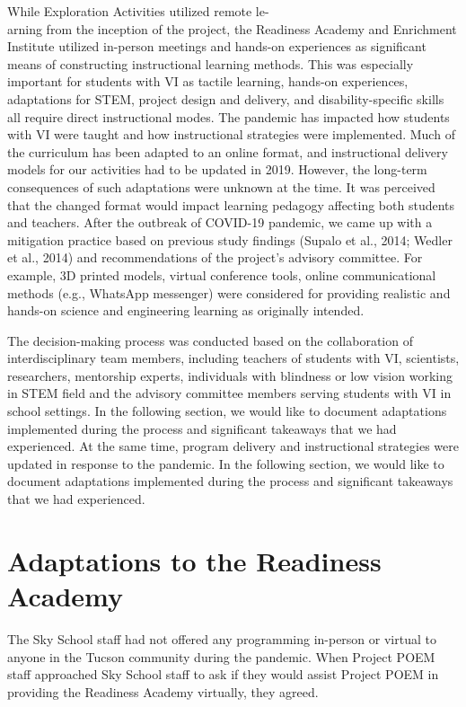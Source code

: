 \documentclass[11pt]{sig-alternate}
\begin{document}
\begin{large}
{While Exploration Activities utilized remote le-\\arning from the inception of the project, the Readiness Academy and Enrichment Institute utilized in-person meetings and hands-on experiences as significant means of constructing instructional learning methods. This was especially important for students with VI as tactile learning, hands-on experiences, adaptations for STEM, project design and delivery, and disability-specific skills all require direct instructional modes. The pandemic has impacted how students with VI were taught and how instructional strategies were implemented. Much of the curriculum has been adapted to an online format, and instructional delivery models for our activities had to be updated in 2019. However, the long-term consequences of such adaptations were unknown at the time. It was perceived that the changed format would impact learning pedagogy affecting both students and teachers. After the outbreak of COVID-19 pandemic, we came up with a mitigation practice based on previous study findings (Supalo et al., 2014; Wedler et al., 2014) and recommendations of the project’s advisory committee. For example, 3D printed models, virtual conference tools, online communicational methods (e.g., WhatsApp messenger) were considered for providing realistic and hands-on science and engineering learning as originally intended. 

The decision-making process was conducted based on the collaboration of interdisciplinary team members, including teachers of students with VI, scientists, researchers, mentorship experts, individuals with blindness or low vision working in STEM field and the advisory committee members serving students with VI in school settings. In the following section, we would like to document adaptations implemented during the process and significant takeaways that we had experienced. At the same time, program delivery and instructional strategies were updated in response to the pandemic. In the following section, we would like to document adaptations implemented during the process and significant takeaways that we had experienced. 

\section*{Adaptations to the Readiness Academy}

The Sky School staff had not offered any programming in-person or virtual to anyone in the Tucson community during the pandemic. When Project POEM staff approached Sky School staff to ask if they would assist Project POEM in providing the Readiness Academy virtually, they agreed. 

}
\end{large}
\end{document}
